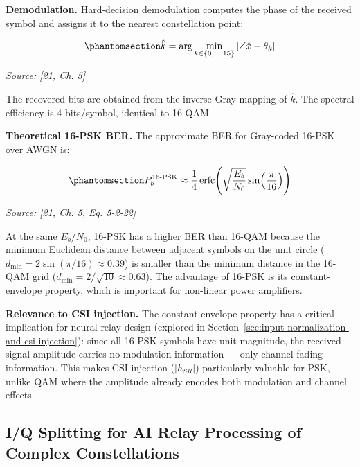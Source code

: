 \textbf{Demodulation.} Hard-decision demodulation computes the phase of the received symbol and assigns it to the nearest constellation point:

\begin{equation}\protect\phantomsection\label{eq:psk16-decision}{\hat{k} = \arg\min_{k \in \{0,\ldots,15\}} \left| \angle \hat{x} - \theta_k \right|
}\end{equation} \par{\small\textit{Source: [21, Ch. 5]}}

The recovered bits are obtained from the inverse Gray mapping of \(\hat{k}\). The spectral efficiency is 4 bits/symbol, identical to 16-QAM.

\textbf{Theoretical 16-PSK BER.} The approximate BER for Gray-coded 16-PSK over AWGN is:

\begin{equation}\protect\phantomsection\label{eq:psk16-ber}{P_b^{\text{16-PSK}} \approx \frac{1}{4} \operatorname{erfc}\!\left(\sqrt{\frac{E_b}{N_0}} \sin\!\left(\frac{\pi}{16}\right)\right)
}\end{equation} \par{\small\textit{Source: [21, Ch. 5, Eq. 5-2-22]}}

At the same \(E_b/N_0\), 16-PSK has a higher BER than 16-QAM because the minimum Euclidean distance between adjacent symbols on the unit circle (\(d_{\min} = 2\sin(\pi/16) \approx 0.39\)) is smaller than the minimum distance in the 16-QAM grid (\(d_{\min} = 2/\sqrt{10} \approx 0.63\)). The advantage of 16-PSK is its constant-envelope property, which is important for non-linear power amplifiers.

\textbf{Relevance to CSI injection.} The constant-envelope property has a critical implication for neural relay design (explored in Section~\ref{sec:input-normalization-and-csi-injection}): since all 16-PSK symbols have unit magnitude, the received signal amplitude carries no modulation information --- only channel fading information. This makes CSI injection (\(|h_{SR}|\)) particularly valuable for PSK, unlike QAM where the amplitude already encodes both modulation and channel effects.

\subsection{I/Q Splitting for AI Relay Processing of Complex Constellations}\label{sec:iq-splitting-for-ai-relay-processing-of-complex-constellations}

